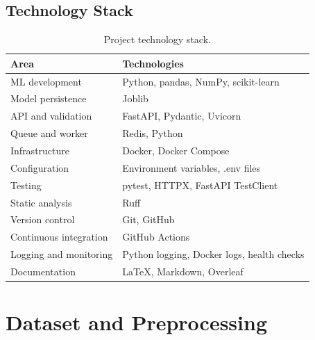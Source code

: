 \documentclass[11pt,a4paper]{article}
\begin{document}
\subsection{Technology Stack}

\begin{table}[H]
\centering
\begin{tabularx}{\linewidth}{@{}lX@{}}
\toprule
\textbf{Area} & \textbf{Technologies}\\
\midrule

ML development &
Python, pandas, NumPy, scikit-learn\\

Model persistence &
Joblib\\

API and validation &
FastAPI, Pydantic, Uvicorn\\

Queue and worker &
Redis, Python\\

Infrastructure &
Docker, Docker Compose\\

Configuration &
Environment variables, .env files\\

Testing &
pytest, HTTPX, FastAPI TestClient\\

Static analysis &
Ruff\\

Version control &
Git, GitHub\\

Continuous integration &
GitHub Actions\\

Logging and monitoring &
Python logging, Docker logs, health checks\\

Documentation &
LaTeX, Markdown, Overleaf\\

\bottomrule
\end{tabularx}
\caption{Project technology stack.}
\end{table}


\section{Dataset and Preprocessing}
\end{document}
